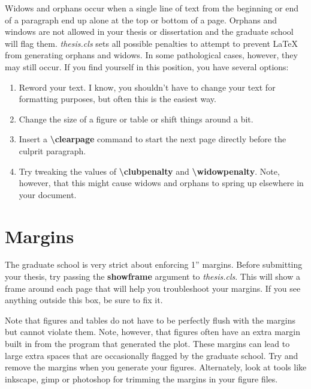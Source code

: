 \documentclass[master]{thesis}
\begin{document}
Widows and orphans occur when a single line of text from the beginning or end of a paragraph end up alone at the top or bottom of a page.  Orphans and windows are not allowed in your thesis or dissertation and the graduate school will flag them.  \textit{thesis.cls} sets all possible penalties to attempt to prevent \LaTeX{} from generating orphans and widows.  In some pathological cases, however, they may still occur.  If you find yourself in this position, you have several options:

\begin{enumerate}
    \item Reword your text.  I know, you shouldn't have to change your text for formatting purposes, but often this is the easiest way.

    \item Change the size of a figure or table or shift things around a bit.

    \item Insert a \textbf{\textbackslash clearpage} command to start the next page directly before the culprit paragraph.

    \item Try tweaking the values of \textbf{\textbackslash clubpenalty} and \textbf{\textbackslash widowpenalty}.  Note, however, that this might cause widows and orphans to spring up elsewhere in your document.
\end{enumerate}

\section{Margins}

The graduate school is very strict about enforcing 1'' margins.  Before submitting your thesis, try passing the \textbf{showframe} argument to \textit{thesis.cls}.  This will show a frame around each page that will help you troubleshoot your margins.  If you see anything outside this box, be sure to fix it.

Note that figures and tables do not have to be perfectly flush with the margins but cannot violate them.  Note, however, that figures often have an extra margin built in from the program that generated the plot.  These margins can lead to large extra spaces that are occasionally flagged by the graduate school.  Try and remove the margins when you generate your figures.  Alternately, look at tools like inkscape, gimp or photoshop for trimming the margins in your figure files.
\end{document}
